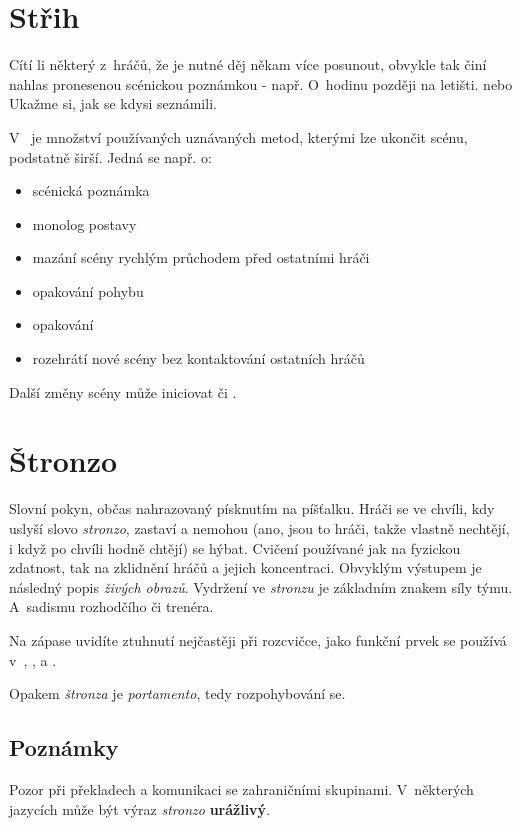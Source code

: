 \needspace{5cm} \section{Střih} \label{střih} Cítí li některý z~hráčů, že je nutné děj někam více posunout, obvykle tak činí nahlas pronesenou scénickou poznámkou  - např. O~hodinu později na letišti.  nebo Ukažme si, jak se kdysi seznámili. 
 
V~ je množství používaných uznávaných metod, kterými  lze ukončit scénu, podstatně širší. 
Jedná se např. o: 
 
\begin{itemize}
\item scénická poznámka
\item monolog postavy
\item mazání scény rychlým průchodem před ostatními hráči
\item opakování pohybu
\item opakování 
\item rozehrátí nové scény bez kontaktování ostatních hráčů
\end{itemize}
 
Další změny scény může iniciovat  či . 
 
 
 
\needspace{5cm} \section{Štronzo} \label{štronzo} Slovní pokyn, občas nahrazovaný písknutím na píšťalku. Hráči se ve chvíli, kdy uslyší slovo \textit{stronzo}, zastaví a nemohou (ano, jsou to hráči, takže vlastně nechtějí, i když po chvíli hodně chtějí) se hýbat. Cvičení používané jak na fyzickou zdatnost, tak na zklidnění hráčů a jejich koncentraci. Obvyklým výstupem je následný popis \textit{živých obrazů}. Vydržení ve \textit{stronzu} je základním znakem síly týmu. A~sadismu rozhodčího či trenéra. 
 
Na zápase uvidíte ztuhnutí nejčastěji při rozcvičce, jako funkční prvek se používá  v~, ,  a  . 
 
Opakem \textit{štronza} je \textit{portamento}, tedy rozpohybování se.  
 
 
 
\subsection{ Poznámky }  
Pozor při překladech a komunikaci se zahraničními skupinami. V~některých jazycích může být výraz \textit{stronzo} \textbf{urážlivý}. 
 
